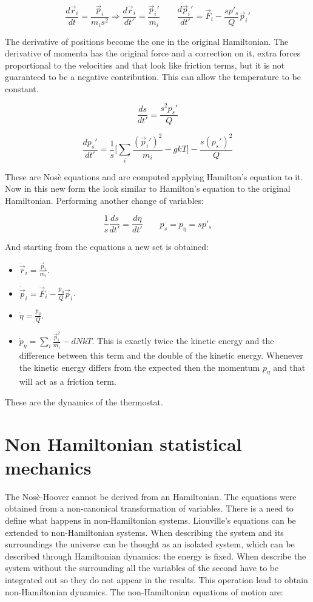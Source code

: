 	$$\frac{d\vec{r}_i}{dt} = \frac{\vec{p}_i}{m_is^2}\Rightarrow\frac{d\vec{r}_i}{dt'} = \frac{\vec{p}_i'}{m_i}\qquad \frac{d\vec{p}_i'}{dt'} = \vec{F}_i-\frac{sp'_s}{Q}\vec{p}_i'$$

	The derivative of positions become the one in the original Hamiltonian.
	The derivative of momenta has the original force and a correction on it, extra forces proportional to the velocities and that look like friction terms, but it is not guaranteed to be a negative contribution.
	This can allow the temperature to be constant.

	$$\frac{ds}{dt'} = \frac{s^2p_s'}{Q}$$

	$$\frac{dp_s'}{dt'} = \frac{1}{s}\biggl[\sum\limits_{i} \frac{(\vec{p}_i')^2}{m_i}-gkT\biggr] - \frac{s(p_s')^2}{Q}$$

	These are Nos\`e equations and are computed applying Hamilton's equation to it.
	Now in this new form the look similar to Hamilton's equation to the original Hamiltonian.
	Performing another change of variables:

	$$\frac{1}{s}\frac{ds}{dt'} = \frac{d\eta}{dt'}\qquad p_s = p_\eta = sp'_s$$

	And starting from the equations a new set is obtained:

	\begin{multicols}{2}
		\begin{itemize}
			\item $\dot{\vec{r}}_i = \frac{\vec{p}_i}{m_i}$.
			\item $\dot{\vec{p}}_i = \vec{F}_i-\frac{p_\eta}{Q}\vec{p}_i$.
			\item $\dot{\eta} = \frac{p_\eta}{Q}$.
			\item $\dot{p}_\eta = \sum\limits_{i}\frac{\vec{p}_i^2}{m_i}-dNkT$.
				This is exactly twice the kinetic energy and the difference between this term and the double of the kinetic energy.
				Whenever the kinetic energy differs from the expected then the momentum $\dot{p}_\eta$ and that will act as a friction term.
		\end{itemize}
	\end{multicols}

These are the dynamics of the thermostat.

\section{Non Hamiltonian statistical mechanics}
The Nos\`e-Hoover cannot be derived from an Hamiltonian.
The equations were obtained from a non-canonical transformation of variables.
There is a need to define what happens in non-Hamiltonian systems.
Liouville's equations can be extended to non-Hamiltonian systems.
When describing the system and its surroundings the universe can be thought as an isolated system, which can be described through Hamiltonian dynamics: the energy is fixed.
When describe the system without the surrounding all the variables of the second have to be integrated out so they do not appear in the results.
This operation lead to obtain non-Hamiltonian dynamics.
The non-Hamiltonian equations of motion are:

